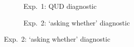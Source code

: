 \documentclass[12pt]{article}
\begin{document}
\begin{figure}[h!]
\centering

\begin{subfigure}{.49\textwidth}
\centering
{}
 \caption{Exp.~1: QUD diagnostic}
 \end{subfigure} 
 \begin{subfigure}{.49\textwidth}
\centering
{}
 \caption{Exp.~2: `asking whether' diagnostic}
 \end{subfigure}


\end{figure}
\end{document}
